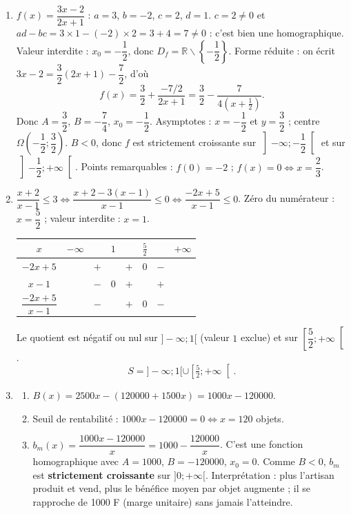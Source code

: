 \documentclass[11pt]{article}
\def\setminus{\mathbin{\backslash}}\let\smallsetminus\setminus
\begin{document}
\begin{corrige}[Exercice n°1]
\begin{enumerate}
    \item $f(x) = \dfrac{3x-2}{2x+1}$ : $a=3$, $b=-2$, $c=2$, $d=1$.
    $c = 2 \neq 0$ et $ad-bc = 3 \times 1 - (-2) \times 2 = 3 + 4 = 7 \neq 0$ : c'est bien une homographique.
    Valeur interdite : $x_0 = -\dfrac{1}{2}$, donc $D_f = \mathbb{R}\setminus\left\{-\dfrac{1}{2}\right\}$.
    Forme réduite : on écrit $3x - 2 = \dfrac{3}{2}(2x+1) - \dfrac{7}{2}$, d'où
    \[
    f(x) = \frac{3}{2} + \frac{-7/2}{2x+1} = \frac{3}{2} - \frac{7}{4\left(x+\frac{1}{2}\right)}.
    \]
    Donc $A = \dfrac{3}{2}$, $B = -\dfrac{7}{4}$, $x_0 = -\dfrac{1}{2}$.
    Asymptotes : $x = -\dfrac{1}{2}$ et $y = \dfrac{3}{2}$ ; centre $\Omega\left(-\dfrac{1}{2} ; \dfrac{3}{2}\right)$.
    $B < 0$, donc $f$ est strictement croissante sur $\left]-\infty; -\dfrac{1}{2}\right[$ et sur $\left]-\dfrac{1}{2}; +\infty\right[$.
    Points remarquables : $f(0) = -2$ ; $f(x) = 0 \Leftrightarrow x = \dfrac{2}{3}$.
    \item $\dfrac{x+2}{x-1} \leq 3 \iff \dfrac{x+2 - 3(x-1)}{x-1} \leq 0 \iff \dfrac{-2x+5}{x-1} \leq 0$.
    Zéro du numérateur : $x = \dfrac{5}{2}$ ; valeur interdite : $x = 1$.
    \begin{center}
    \begin{tabular}{|c|ccccccc|}\hline
    $x$ & $-\infty$ & & $1$ & & $\frac{5}{2}$ & & $+\infty$ \\ \hline
    $-2x+5$ & & $+$ & & $+$ & $0$ & $-$ & \\ \hline
    $x-1$ & & $-$ & $0$ & $+$ & & $+$ & \\ \hline
    $\dfrac{-2x+5}{x-1}$ & & $-$ & & $+$ & $0$ & $-$ & \\ \hline
    \end{tabular}
    \end{center}
    Le quotient est négatif ou nul sur $]-\infty; 1[$ (valeur $1$ exclue) et sur $\left[\dfrac{5}{2}; +\infty\right[$.
    \[
    S = ]-\infty; 1[ \cup \left[\tfrac{5}{2}; +\infty\right[.
    \]
    \item
    \begin{enumerate}
        \item $B(x) = 2500x - (120000 + 1500x) = 1000x - 120000$.
        \item Seuil de rentabilité : $1000x - 120000 = 0 \iff x = 120$ objets.
        \item $b_m(x) = \dfrac{1000x - 120000}{x} = 1000 - \dfrac{120000}{x}$.
        C'est une fonction homographique avec $A = 1000$, $B = -120000$, $x_0 = 0$.
        Comme $B < 0$, $b_m$ est \textbf{strictement croissante} sur $]0; +\infty[$.
        Interprétation : plus l'artisan produit et vend, plus le bénéfice moyen par objet augmente ; il se rapproche de \num{1000} F (marge unitaire) sans jamais l'atteindre.
    \end{enumerate}
\end{enumerate}
\end{corrige}
\end{document}
